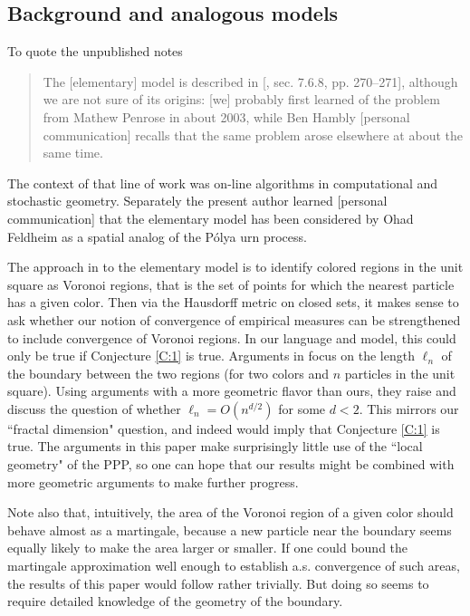 \documentclass[12pt]{article}
\begin{document}
\subsection{Background and analogous models}
\label{sec:background}
To quote the unpublished notes \cite{jordan-wade}
\begin{quote}
The [elementary] model is described in [\cite{penrose-wade},  sec. 7.6.8, pp. 270--271], 
although we are not sure of its origins: [we]  probably first learned of the problem from Mathew Penrose in about 2003, 
while Ben Hambly [personal communication] recalls that the same problem arose elsewhere at about the same time.
\end{quote}
The context of that line of work was on-line algorithms in computational and stochastic geometry.
Separately the present author learned [personal communication] that the elementary model has been considered by
Ohad Feldheim as a spatial analog of the P\'{o}lya  urn process. 

The approach in  \cite{jordan-wade} to  the elementary model 
 is to identify colored regions in the unit square as Voronoi regions, that is the set of points for which the nearest particle has a given color.
 Then via the Hausdorff metric on closed sets, it makes sense to ask whether our notion of convergence of empirical measures can be strengthened to include convergence of Voronoi  regions. 
In our language and model, this could only  be true if Conjecture \ref{C:1} is true. 
 Arguments in  \cite{jordan-wade} focus on the  length  $\ell_n$ of the boundary between the two regions (for two colors and $n$ particles in the unit square).
 Using arguments with a more geometric flavor than ours, they 
  raise and discuss  the question of whether $\ell_n = O(n^{d/2})$ for some $d<2$.  
  This mirrors our ``fractal dimension" question, and indeed would imply that Conjecture \ref{C:1} is true.   
  The arguments in this paper make surprisingly little use of the ``local geometry" of the PPP, so
 one can hope that our results might be combined with  more geometric arguments to make further progress.
 
 Note also that, intuitively, the area of the Voronoi region of a given color should behave almost as a martingale, because a 
 new particle near the boundary seems equally likely to make the area larger or smaller. 
 If one could bound the martingale approximation well enough to establish a.s. convergence of such areas, the results of this paper would follow rather trivially.
 But doing so seems to require detailed knowledge of the geometry of the boundary.
 
\end{document}
